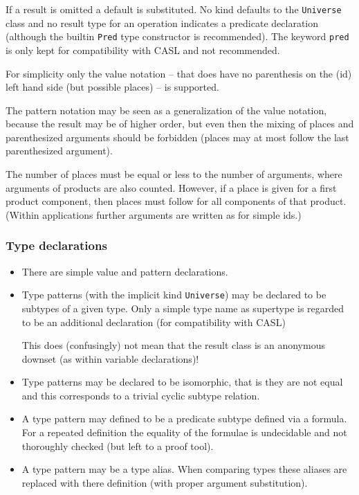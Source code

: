 \documentclass{article}
\begin{document}
If a result is omitted a default is substituted. No kind defaults to the
\texttt{Universe} class and no result type for an operation indicates a
predicate declaration (although the builtin \texttt{Pred} type constructor is
recommended). The keyword \texttt{pred} is only kept for compatibility with
CASL and not recommended.

For simplicity only the value notation -- that does have no parenthesis on the
(id) left hand side (but possible places) -- is supported. 

The pattern notation may be seen as a generalization of the value notation,
because the result may be of higher order, but even then the mixing of places
and parenthesized arguments should be forbidden (places may at most follow the
last parenthesized argument).

The number of places must be equal or less to the number of arguments, where
arguments of products are also counted. However, if a place is given for a
first product component, then places must follow for all components of that
product. (Within applications further arguments are written as for
simple ids.)

\subsubsection*{Type declarations}

\begin{itemize}
\item There are simple value and pattern declarations. 
\item Type patterns (with the implicit kind \texttt{Universe})
  may be declared to be subtypes of a given type. Only a simple type name as
  supertype is regarded to be an additional declaration (for compatibility
  with CASL)
  
  This does (confusingly) not mean that the result class is an anonymous
  downset (as within variable declarations)!
\item Type patterns may be declared to be isomorphic, that is
  they are not equal and this corresponds to a trivial cyclic subtype
  relation.
\item A type pattern may defined to be a predicate subtype defined via a
  formula. For a repeated definition the equality of the formulae is
  undecidable and not thoroughly checked (but left to a proof tool).  
\item A type pattern may be a type alias. When comparing types these aliases
  are replaced with there definition (with proper argument substitution). 
\end{itemize}
\end{document}
